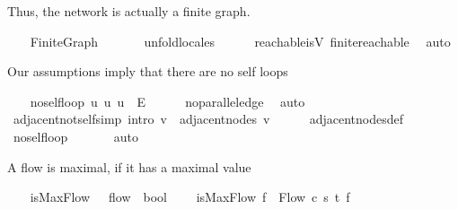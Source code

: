 \begin{isabellebody}
\endisatagproof
{\isafoldproof}%
%
\isadelimproof
%
\endisadelimproof
%
\begin{isamarkuptext}%
Thus, the network is actually a finite graph.%
\end{isamarkuptext}\isamarkuptrue%
\ \ \isamarkupfalse%
\ Finite{\isacharunderscore}Graph\ \isanewline
%
\isadelimproof
\ \ \ \ %
\endisadelimproof
%
\isatagproof
{}\isamarkupfalse%
\ unfold{\isacharunderscore}locales\isanewline
\ \ \ \ \isamarkupfalse%
\ reachable{\isacharunderscore}is{\isacharunderscore}V\ finite{\isacharunderscore}reachable\ \isamarkupfalse%
\ auto%
\endisatagproof
{\isafoldproof}%
%
\isadelimproof
%
\endisadelimproof
%
\begin{isamarkuptext}%
Our assumptions imply that there are no self loops%
\end{isamarkuptext}\isamarkuptrue%
\ \ \isamarkupfalse%
\ no{\isacharunderscore}self{\isacharunderscore}loop{\isacharcolon}\ {\isachardoublequoteopen}{\isasymforall}u{\isachardot}\ {\isacharparenleft}u{\isacharcomma}\ u{\isacharparenright}\ {\isasymnotin}\ E{\isachardoublequoteclose}\isanewline
%
\isadelimproof
\ \ \ \ %
\endisadelimproof
%
\isatagproof
{}\isamarkupfalse%
\ no{\isacharunderscore}parallel{\isacharunderscore}edge\ \isamarkupfalse%
\ auto%
\endisatagproof
{\isafoldproof}%
%
\isadelimproof
\isanewline
%
\endisadelimproof
\isanewline
\ \ \isamarkupfalse%
\ adjacent{\isacharunderscore}not{\isacharunderscore}self{\isacharbrackleft}simp{\isacharcomma}\ intro{\isacharbang}{\isacharbrackright}{\isacharcolon}\ {\isachardoublequoteopen}v\ {\isasymnotin}\ adjacent{\isacharunderscore}nodes\ v{\isachardoublequoteclose}\isanewline
%
\isadelimproof
\ \ \ \ %
\endisadelimproof
%
\isatagproof
{}\isamarkupfalse%
\ adjacent{\isacharunderscore}nodes{\isacharunderscore}def\ \isamarkupfalse%
\ no{\isacharunderscore}self{\isacharunderscore}loop\ \isanewline
\ \ \ \ \isamarkupfalse%
\ auto%
\endisatagproof
{\isafoldproof}%
%
\isadelimproof
%
\endisadelimproof
%
\begin{isamarkuptext}%
A flow is maximal, if it has a maximal value%
\end{isamarkuptext}\isamarkuptrue%
\ \ \isamarkupfalse%
\ isMaxFlow\ {\isacharcolon}{\isacharcolon}\ {\isachardoublequoteopen}{\isacharunderscore}\ flow\ {\isasymRightarrow}\ bool{\isachardoublequoteclose}\ \isanewline
\ \ \ {\isachardoublequoteopen}isMaxFlow\ f\ {\isasymequiv}\ Flow\ c\ s\ t\ f\ {\isasymand}\ \isanewline

\end{isabellebody}
